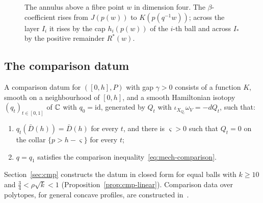 \begin{figure}[ht]
\centering
{}
\caption{The annulus above a fibre point $w$ in dimension four. The $\beta$-coefficient rises from $J(p(w))$ to
$K(p(q^{-1}w))$; across the layer $I_i$ it rises by the cap $h_i(p(w))$ of the $i$-th ball and across $I_*$ by the
positive remainder $R^*(w)$.}
\label{fig:mech-layers}
\end{figure}

\subsection{The comparison datum}\label{sec:mech-interfaces}

\begin{definition}\label{def:mech-datum}
A comparison datum for $([0,h],P)$ with gap $\gamma>0$ consists of a function $K$, smooth on a neighbourhood of
$[0,h]$, and a smooth Hamiltonian isotopy $(q_t)_{t\in[0,1]}$ of $\mathbb{C}$ with $q_0=\mathrm{id}$, generated by $Q_t$ with
$\iota_{X_{Q_t}}\omega_V=-dQ_t$, such that:
\begin{enumerate}[label=(\arabic*),ref=(\arabic*)]
\item\label{it:mech-datum-collar} $q_t(\bar D(h))=\bar D(h)$ for every $t$, and there is $\varsigma>0$ such that
 $Q_t=0$ on the collar $\{p>h-\varsigma\}$ for every $t$;
\item\label{it:mech-datum-cmp} $q=q_1$ satisfies the comparison inequality~\eqref{eq:mech-comparison}.
\end{enumerate}
\end{definition}

Section~\ref{sec:cmp} constructs the datum in closed form for equal balls with $k\ge10$ and $\frac34<\rho\sqrt k<1$
(Proposition~\ref{prop:cmp-linear}). Comparison data over polytopes, for general concave profiles, are constructed
in~\cite{SongHD}.
